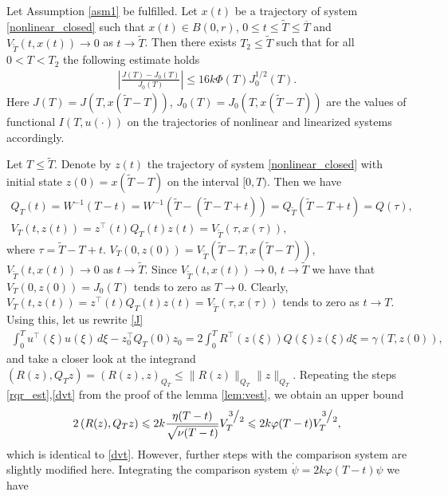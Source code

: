 \documentclass[../main.tex]{subfiles}
\begin{document}
\begin{theorem}\label{th:functional_error_estimate}
  Let Assumption \ref{asm1} be fulfilled. Let $x(t)$ be a trajectory of system \eqref{nonlinear_closed}  such that $x(t)\in B(0,r)$, $0\leqslant t  \leqslant \tilde{T} \leqslant \overline{T} $ and $V_{\tilde{T}}(t,x(t))\to 0$ as $t\to \tilde{T}$. Then there exists $T_2 \leqslant \tilde{T}$ such that for all $0 < T < T_2 $ the following estimate holds
   \begin{gather} \label{est}
	 \left| \frac{	J(T) - J_0(T)}{J_0(T)}\right| \leqslant 16k\Phi({T})J^{1/2}_0(T).
    \end{gather}
    Here $J(T)=J(T,x(\tilde{T}-T))$, $J_0(T)=J_0(T,x(\tilde{T}-T))$ are the values of functional $I(T,u(\cdot))$ on the trajectories of nonlinear and linearized systems accordingly.
\end{theorem}
\doc
Let $T\leqslant \tilde{T}$. Denote by $z(t)$ the trajectory  of system \eqref{nonlinear_closed} with initial state $z(0)=x(\tilde{T}-T)$ on the interval $[0,T)$. Then we have 
\begin{gather*}
Q_T(t)=W^{-1}(T-t)=W^{-1}(\tilde{T}-(\tilde{T}-T+t))=Q_{\tilde{T}}(\tilde{T}-T+t) = Q(\tau), \\ V_T(t,z(t))=z^\top(t)Q_T(t)z(t)=V_{\tilde{T}}(\tau,x(\tau)),
\end{gather*}
where $\tau=\tilde{T}-T+t$. $V_T(0,z(0))=V_{\tilde{T}}(\tilde{T}-T, x(\tilde{T}-T))$, $V_{\tilde{T}}(t,x(t))\to 0$ as $t\to \tilde{T}$. Since  $V_{\tilde{T}}(t,x(t))\to 0$,  $t\to \tilde{T}$ we have that $V_T(0,z(0))=J_0(T)$  tends to zero as $T\to 0$.
Clearly,  $V_T(t,z(t))=z^\top(t)Q_T(t)z(t)=V_{\tilde{T}}(\tau,x(\tau))$ tends to zero as $t\to T$.
Using this, let us rewrite \eqref{J} 
\begin{gather}\label{J1}
	 \int_{0}^{T} u^{\top}(\xi)  u(\xi) \, d\xi - z_0^{\top} Q_T(0)z_0= 2\int_{0}^{T}  R^{\top}(z(\xi))Q(\xi) z(\xi) d\xi=\gamma(T,z(0)),
\end{gather}
and take a closer look at the integrand $\left( R(z), Q_T z\right)=(R(z),z)_{Q_T} \leqslant \| R(z) \|_{Q_T} \| z \|_{Q_T}$.
Repeating the steps \eqref{rqr_est},\eqref{dvt} from the proof of the lemma \ref{lem:vest}, we obtain an upper bound
\begin{gather}\label{rqz}
    2 \left( R(z), Q_T z\right) \leqslant 2 k \frac{\eta(T-t)}{\sqrt{\nu(T-t)}}V_T^{\frc{3}{2}} \leqslant 2k \varphi(T-t) V_T^{\frc{3}{2}},
\end{gather}
which is identical to \eqref{dvt}. However, further steps with the comparison system are slightly modified here. Integrating the comparison system $\dot{\psi} = 2k \varphi(T-t) \psi$ we have
\end{document}
